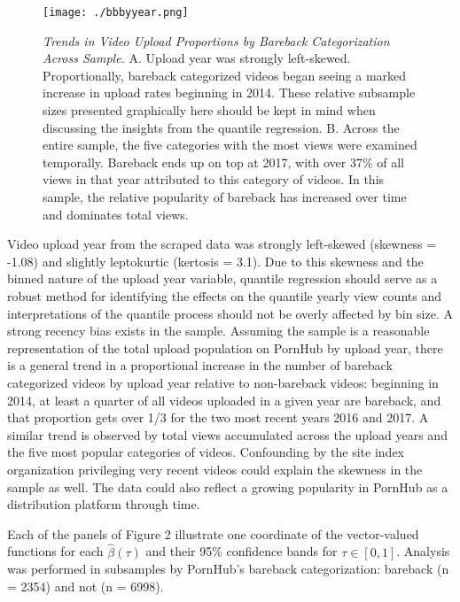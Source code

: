 \documentclass[]{article}
\begin{document}
\begin{figure}
\centering
\texttt{[image: ./bbbyyear.png]}
\caption{\emph{Trends in Video Upload Proportions by Bareback
Categorization Across Sample.} A. Upload year was strongly left-skewed.
Proportionally, bareback categorized videos began seeing a marked
increase in upload rates beginning in 2014. These relative subsample
sizes presented graphically here should be kept in mind when discussing
the insights from the quantile regression. B. Across the entire sample,
the five categories with the most views were examined temporally.
Bareback ends up on top at 2017, with over 37\% of all views in that
year attributed to this category of videos. In this sample, the relative
popularity of bareback has increased over time and dominates total
views.}
\end{figure}

Video upload year from the scraped data was strongly left-skewed
(skewness = -1.08) and slightly leptokurtic (kertosis = 3.1). Due to
this skewness and the binned nature of the upload year variable,
quantile regression should serve as a robust method for identifying the
effects on the quantile yearly view counts and interpretations of the
quantile process should not be overly affected by bin size. A strong
recency bias exists in the sample. Assuming the sample is a reasonable
representation of the total upload population on PornHub by upload year,
there is a general trend in a proportional increase in the number of
bareback categorized videos by upload year relative to non-bareback
videos: beginning in 2014, at least a quarter of all videos uploaded in
a given year are bareback, and that proportion gets over 1/3 for the two
most recent years 2016 and 2017. A similar trend is observed by total
views accumulated across the upload years and the five most popular
categories of videos. Confounding by the site index organization
privileging very recent videos could explain the skewness in the sample
as well. The data could also reflect a growing popularity in PornHub as
a distribution platform through time.

Each of the panels of Figure 2 illustrate one coordinate of the
vector-valued functions for each \(\hat{\beta}\left (\tau \right )\) and
their 95\% confidence bands for \(\tau \in \left [0,1 \right ]\).
Analysis was performed in subsamples by PornHub's bareback
categorization: bareback (n = 2354) and not (n = 6998).
\end{document}
